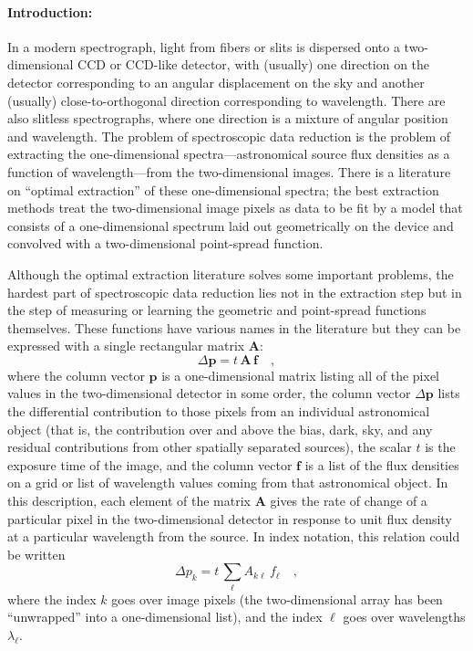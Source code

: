 \documentclass[12pt]{article}
\newcommand{\hmatrix}[1]{\boldsymbol{#1}}
\newcommand{\Amatrix}{\hmatrix{A}}
\newcommand{\pixels}{\hmatrix{p}}
\newcommand{\flux}{\hmatrix{f}}
\newcommand{\exptime}{t}
\begin{document}
\paragraph{Introduction:}
In a modern spectrograph, light from fibers or slits is dispersed onto
a two-dimensional CCD or CCD-like detector, with (usually) one
direction on the detector corresponding to an angular displacement on
the sky and another (usually) close-to-orthogonal direction
corresponding to wavelength.  There are also slitless spectrographs,
where one direction is a mixture of angular position and wavelength.
The problem of spectroscopic data reduction is the problem of
extracting the one-dimensional spectra---astronomical source flux
densities as a function of wavelength---from the two-dimensional
images.  There is a literature on ``optimal extraction'' of these
one-dimensional spectra; the best extraction methods treat the
two-dimensional image pixels as data to be fit by a model that
consists of a one-dimensional spectrum laid out geometrically on the
device and convolved with a two-dimensional point-spread function.

Although the optimal extraction literature solves some important
problems, the hardest part of spectroscopic data reduction lies not in
the extraction step but in the step of measuring or learning the
geometric and point-spread functions themselves.  These functions have
various names in the literature but they can be expressed with a
single rectangular matrix $\Amatrix$:
\begin{equation}
\Delta\pixels = \exptime\,\Amatrix\,\flux \quad ,
\end{equation}
where the column vector $\pixels$ is a one-dimensional matrix listing
all of the pixel values in the two-dimensional detector in some order,
the column vector $\Delta\pixels$ lists the differential contribution
to those pixels from an individual astronomical object (that is, the
contribution over and above the bias, dark, sky, and any residual
contributions from other spatially separated sources), the scalar
$\exptime$ is the exposure time of the image, and the column vector
$\flux$ is a list of the flux densities on a grid or list of
wavelength values coming from that astronomical object.  In this
description, each element of the matrix $\Amatrix$ gives the rate of
change of a particular pixel in the two-dimensional detector in
response to unit flux density at a particular wavelength from the
source.  In index notation, this relation could be written
\begin{equation}
\Delta p_k = \exptime\,\sum_{\ell} A_{k\ell}\,f_{\ell} \quad ,
\end{equation}
where the index $k$ goes over image pixels (the two-dimensional array
has been ``unwrapped'' into a one-dimensional list), and the index
$\ell$ goes over wavelengths $\lambda_{\ell}$.
\end{document}
